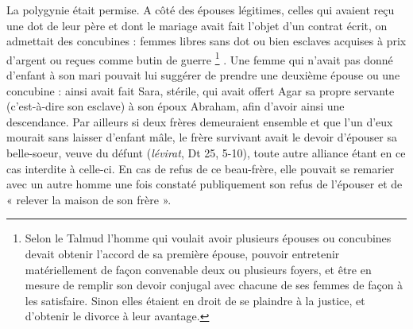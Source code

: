 La polygynie était permise. A côté des épouses légitimes, celles qui avaient reçu une dot de leur père et dont le mariage avait fait l'objet d'un contrat écrit, on admettait des concubines : femmes libres sans dot ou bien esclaves acquises à prix d'argent ou reçues comme butin de guerre%
\footnote{Selon le Talmud l'homme qui voulait avoir plusieurs épouses ou concubines devait obtenir l'accord de sa première épouse, pouvoir entretenir matériellement de façon convenable deux ou plusieurs foyers, et être en mesure de remplir son devoir conjugal avec chacune de ses femmes de façon à les satisfaire. Sinon elles étaient en droit de se plaindre à la justice, et d'obtenir le divorce à leur avantage.}%
. Une femme qui n'avait pas donné d'enfant à son mari pouvait lui suggérer de prendre une deuxième épouse ou une concubine : ainsi avait fait Sara, stérile, qui avait offert Agar sa propre servante (c'est-à-dire son esclave) à son époux Abraham, afin d'avoir ainsi une descendance. Par ailleurs si deux frères demeuraient ensemble et que l'un d'eux  mourait sans laisser d'enfant mâle, le frère survivant avait le devoir d'épouser sa belle-soeur, veuve du défunt (\emph{lévirat}, Dt 25, 5-10), toute autre alliance étant en ce cas interdite à celle-ci. En cas de refus de ce beau-frère, elle pouvait se remarier avec un autre homme une fois constaté publiquement son refus de l'épouser et de « relever la maison de son frère ».



